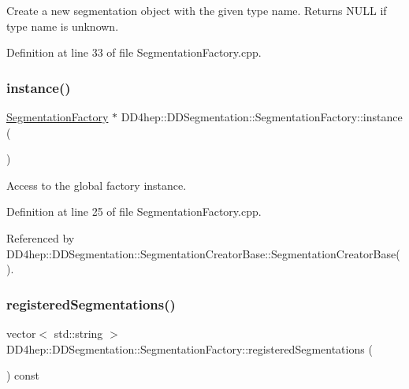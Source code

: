 Create a new segmentation object with the given type name. Returns N\+U\+LL if type name is unknown. 



Definition at line 33 of file Segmentation\+Factory.\+cpp.

\hypertarget{class_d_d4hep_1_1_d_d_segmentation_1_1_segmentation_factory_a92954fdbd0bc642e5b594ef7f4ee3cfc}{}\label{class_d_d4hep_1_1_d_d_segmentation_1_1_segmentation_factory_a92954fdbd0bc642e5b594ef7f4ee3cfc} 
\subsubsection{\texorpdfstring{instance()}{instance()}}
{\footnotesize\ttfamily \hyperlink{class_d_d4hep_1_1_d_d_segmentation_1_1_segmentation_factory}{Segmentation\+Factory} $\ast$ D\+D4hep\+::\+D\+D\+Segmentation\+::\+Segmentation\+Factory\+::instance (\begin{DoxyParamCaption}{ }\end{DoxyParamCaption})\hspace{0.3cm}{\ttfamily [static]}}



Access to the global factory instance. 



Definition at line 25 of file Segmentation\+Factory.\+cpp.



Referenced by D\+D4hep\+::\+D\+D\+Segmentation\+::\+Segmentation\+Creator\+Base\+::\+Segmentation\+Creator\+Base().

\hypertarget{class_d_d4hep_1_1_d_d_segmentation_1_1_segmentation_factory_ac1841ece32e4c1d879088ab6729e6a7d}{}\label{class_d_d4hep_1_1_d_d_segmentation_1_1_segmentation_factory_ac1841ece32e4c1d879088ab6729e6a7d} 
\subsubsection{\texorpdfstring{registered\+Segmentations()}{registeredSegmentations()}}
{\footnotesize\ttfamily vector$<$ std\+::string $>$ D\+D4hep\+::\+D\+D\+Segmentation\+::\+Segmentation\+Factory\+::registered\+Segmentations (\begin{DoxyParamCaption}{ }\end{DoxyParamCaption}) const}



